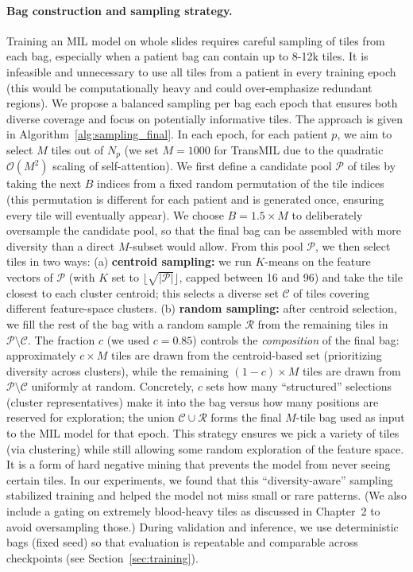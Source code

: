 \paragraph{Bag construction and sampling strategy.}
Training an MIL model on whole slides requires careful sampling of tiles from each bag, especially when a patient bag can contain up to 8-12k tiles. It is infeasible and unnecessary to use all tiles from a patient in every training epoch (this would be computationally heavy and could over-emphasize redundant regions). We propose a balanced sampling per bag each epoch that ensures both diverse coverage and focus on potentially informative tiles. The approach is given in Algorithm~\ref{alg:sampling_final}. In each epoch, for each patient $p$, we aim to select $M$ tiles out of $N_p$ (we set $M=1000$ for TransMIL due to the quadratic $\mathcal{O}(M^2)$ scaling of self-attention). We first define a candidate pool $\mathcal{P}$ of tiles by taking the next $B$ indices from a fixed random permutation of the tile indices (this permutation is different for each patient and is generated once, ensuring every tile will eventually appear). We choose $B = 1.5\times M$ to deliberately oversample the candidate pool, so that the final bag can be assembled with more diversity than a direct $M$-subset would allow. From this pool $\mathcal{P}$, we then select tiles in two ways: (a) \textbf{centroid sampling:} we run $K$-means on the feature vectors of $\mathcal{P}$ (with $K$ set to $\lfloor \sqrt{|\mathcal{P}|}\rfloor$, capped between 16 and 96) and take the tile closest to each cluster centroid; this selects a diverse set $\mathcal{C}$ of tiles covering different feature-space clusters. (b) \textbf{random sampling:} after centroid selection, we fill the rest of the bag with a random sample $\mathcal{R}$ from the remaining tiles in $\mathcal{P} \setminus \mathcal{C}$. The fraction $c$ (we used $c=0.85$) controls the \emph{composition} of the final bag: approximately $c\times M$ tiles are drawn from the centroid-based set (prioritizing diversity across clusters), while the remaining $(1-c)\times M$ tiles are drawn from $\mathcal{P}\setminus\mathcal{C}$ uniformly at random. Concretely, $c$ sets how many “structured” selections (cluster representatives) make it into the bag versus how many positions are reserved for exploration; the union $\mathcal{C}\cup\mathcal{R}$ forms the final $M$-tile bag used as input to the MIL model for that epoch. This strategy ensures we pick a variety of tiles (via clustering) while still allowing some random exploration of the feature space. It is a form of hard negative mining that prevents the model from never seeing certain tiles. In our experiments, we found that this “diversity-aware” sampling stabilized training and helped the model not miss small or rare patterns. (We also include a gating on extremely blood-heavy tiles as discussed in Chapter~2 to avoid oversampling those.) During validation and inference, we use deterministic bags (fixed seed) so that evaluation is repeatable and comparable across checkpoints (see Section~\ref{sec:training}).

